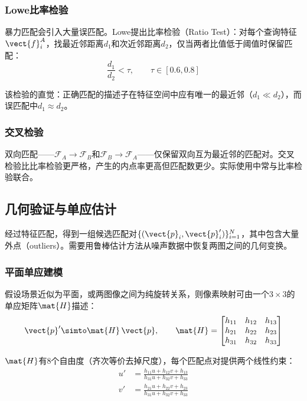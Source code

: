 \subsubsection{Lowe比率检验}

暴力匹配会引入大量误匹配。Lowe提出比率检验（Ratio Test）：对每个查询特征$\vect{f}_i^A$，找最近邻距离$d_1$和次近邻距离$d_2$，仅当两者比值低于阈值时保留匹配：
\begin{equation}
\frac{d_1}{d_2} < \tau, \qquad \tau \in [0.6, 0.8]
\label{eq:ratio-test}
\end{equation}

该检验的直觉：正确匹配的描述子在特征空间中应有唯一的最近邻（$d_1 \ll d_2$），而误匹配中$d_1 \approx d_2$。

\subsubsection{交叉检验}

双向匹配——$\mathcal{F}_A \to \mathcal{F}_B$和$\mathcal{F}_B \to \mathcal{F}_A$——仅保留双向互为最近邻的匹配对。交叉检验比比率检验更严格，产生的内点率更高但匹配数更少。实际使用中常与比率检验联合。

\subsection{几何验证与单应估计}
\label{sec:ransac-homography}

经过特征匹配，得到一组候选匹配对$\{(\vect{p}_i, \vect{p}_i')\}_{i=1}^{N}$，其中包含大量外点（outliers）。需要用鲁棒估计方法从噪声数据中恢复两图之间的几何变换。

\subsubsection{平面单应建模}

假设场景近似为平面，或两图像之间为纯旋转关系，则像素映射可由一个$3\times 3$的单应矩阵$\mat{H}$描述：
\begin{equation}
\vect{p}' \simto \mat{H}\,\vect{p},
\qquad
\mat{H} = \begin{bmatrix}
h_{11} & h_{12} & h_{13} \\
h_{21} & h_{22} & h_{23} \\
h_{31} & h_{32} & h_{33}
\end{bmatrix}
\label{eq:feature-H}
\end{equation}

$\mat{H}$有8个自由度（齐次等价去掉尺度），每个匹配点对提供两个线性约束：
\begin{align}
u' &= \frac{h_{11}u + h_{12}v + h_{13}}{h_{31}u + h_{32}v + h_{33}} \label{eq:H-constraint-u} \\
v' &= \frac{h_{21}u + h_{22}v + h_{23}}{h_{31}u + h_{32}v + h_{33}} \label{eq:H-constraint-v}
\end{align}

